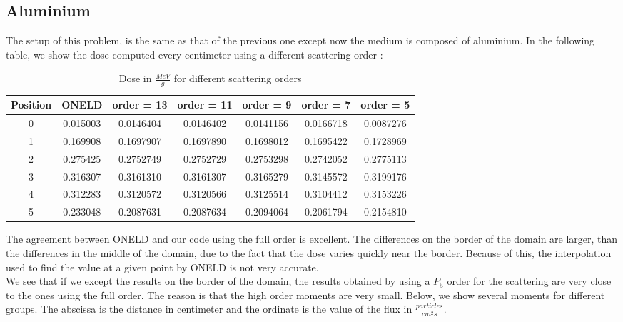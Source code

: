 \subsection{Aluminium}
The setup of this problem, is the same as that of the previous one except now 
the medium is composed of aluminium. In the following table, we show the dose 
computed every centimeter using a different scattering order :
\begin{table}[H]
\begin{center}
\caption{Dose in $\frac{MeV}{g}$ for different scattering orders}
\begin{tabular}{|c|c|c|c|c|c|c|}
\hline
Position & ONELD & order = 13 & order = 11 & order = 9 & order = 7 & order = 5 \\
\hline
0 & 0.015003 & 0.0146404 & 0.0146402 & 0.0141156 & 0.0166718 & 0.0087276 \\
1 & 0.169908 & 0.1697907 & 0.1697890 & 0.1698012 & 0.1695422 & 0.1728969 \\
2 & 0.275425 & 0.2752749 & 0.2752729 & 0.2753298 & 0.2742052 & 0.2775113 \\
3 & 0.316307 & 0.3161310 & 0.3161307 & 0.3165279 & 0.3145572 & 0.3199176 \\
4 & 0.312283 & 0.3120572 & 0.3120566 & 0.3125514 & 0.3104412 & 0.3153226 \\
5 & 0.233048 & 0.2087631 & 0.2087634 & 0.2094064 & 0.2061794 & 0.2154810 \\
\hline
\end{tabular}
\end{center}
\end{table}     
The agreement between ONELD and our code using the full order is excellent.
The differences on the border of the domain are larger, than the differences
in the middle of the domain, due to the fact that
the dose varies quickly near the border. Because of this, the interpolation 
used to find the value at a given point by ONELD is not very accurate.\\ 
We see that if we except the results on the border of the domain, the results 
obtained by using a $P_5$ order for the scattering are very close to the ones 
using the
full order. The reason is that the high order moments are very small. Below,
we show several moments for different groups. The abscissa is the distance in
centimeter and the ordinate is the value of the flux in $\frac{particles}{cm^2
s}$.

